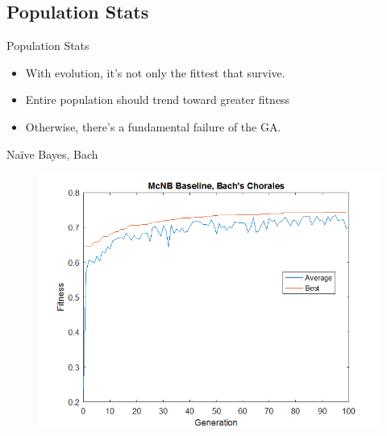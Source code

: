 \documentclass{beamer}
\begin{document}
\subsection{Population Stats}
\begin{frame}{Population Stats}
\begin{itemize}
	\item With evolution, it's not only the fittest that survive.
	\item Entire population should trend toward greater fitness
	\item Otherwise, there's a fundamental failure of the GA.
\end{itemize}	
\end{frame}

\begin{frame} {Na\"ive Bayes, Bach}
	\begin{figure}
		\centering
		\includegraphics[width=.95\linewidth]{figures/png/fitnessBachMcNBBase}
		\label{fig:fitnessbachmcnbbase}
	\end{figure}
	
\end{frame}
\end{document}
